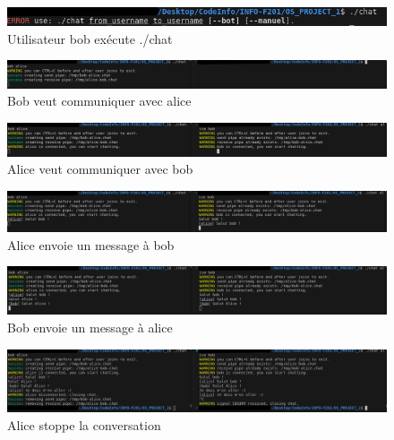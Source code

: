 \documentclass{article}
\begin{document}
\begin{figure}[H]
    \centering
    \includegraphics[width=\textwidth]{1.png}
    \caption{Utilisateur bob exécute ./chat}
    \label{fig:1}
\end{figure}
\begin{figure}[H]
    \centering
    \includegraphics[width=\textwidth]{2.png}
    \caption{Bob veut communiquer avec alice}
    \label{fig:2}
\end{figure}
\begin{figure}[H]
    \centering
    \includegraphics[width=\textwidth]{3.png}
    \caption{Alice veut communiquer avec bob}
    \label{fig:3}
\end{figure}
\begin{figure}[H]
    \centering
    \includegraphics[width=\textwidth]{4.png}
    \caption{Alice envoie un message à bob}
    \label{fig:4}
\end{figure}
\begin{figure}[H]
    \centering
    \includegraphics[width=\textwidth]{5.png}
    \caption{Bob envoie un message à alice}
    \label{fig:5}
\end{figure}
\begin{figure}[H]
    \centering
    \includegraphics[width=\textwidth]{6.png}
    \caption{Alice stoppe la conversation}
    \label{fig:6}
\end{figure}
\end{document}
